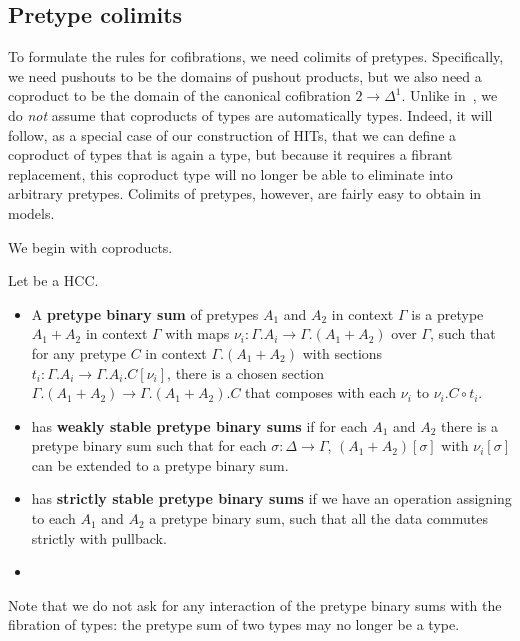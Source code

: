 \documentclass{amsart}
\begin{document}
\subsection{Pretype colimits}
\label{sec:pretype-colimits}

To formulate the rules for cofibrations, we need colimits of pretypes.
Specifically, we need pushouts to be the domains of pushout products, but we also need a coproduct to be the domain of the canonical cofibration $2\to \Delta^1$.
Unlike in~\cite{vv:hts}, we do \emph{not} assume that coproducts of types are automatically types.
Indeed, it will follow, as a special case of our construction of HITs, that we can define a coproduct of types that is again a type, but because it requires a fibrant replacement, this coproduct type will no longer be able to eliminate into arbitrary pretypes.
Colimits of pretypes, however, are fairly easy to obtain in models.

We begin with coproducts.

\begin{definition}
  Let \E be a HCC.
  \begin{itemize}
  \item A \textbf{pretype binary sum} of pretypes $A_1$ and $A_2$ in context $\Gamma$ is a pretype $A_1+A_2$ in context $\Gamma$ with maps $\nu_i : \Gamma.A_i \to \Gamma.(A_1+A_2)$ over $\Gamma$, such that for any pretype $C$ in context $\Gamma.(A_1+A_2)$ with sections $t_i :\Gamma.A_i \to \Gamma.A_i.C[\nu_i]$, there is a chosen section $\Gamma.(A_1+A_2) \to \Gamma.(A_1+A_2).C$ that composes with each $\nu_i$ to $\nu_i.C \circ t_i$.
  \item \E has \textbf{weakly stable pretype binary sums} if for each $A_1$ and $A_2$ there is a pretype binary sum such that for each $\sigma:\Delta\to\Gamma$, $(A_1+A_2)[\sigma]$ with $\nu_i[\sigma]$ can be extended to a pretype binary sum.
  \item \E has \textbf{strictly stable pretype binary sums} if we have an operation assigning to each $A_1$ and $A_2$ a pretype binary sum, such that all the data commutes strictly with pullback.
  \item {}
  \end{itemize}
\end{definition}

Note that we do not ask for any interaction of the pretype binary sums with the fibration of types: the pretype sum of two types may no longer be a type.
\end{document}
